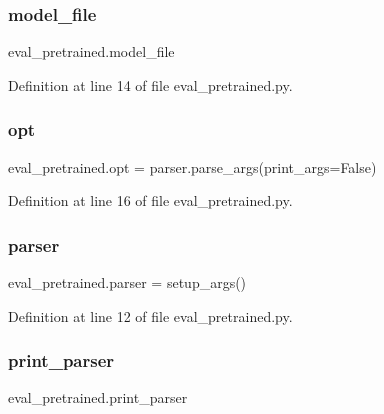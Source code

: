 \subsubsection{\texorpdfstring{model\+\_\+file}{model\_file}}
{\footnotesize\ttfamily eval\+\_\+pretrained.\+model\+\_\+file}



Definition at line 14 of file eval\+\_\+pretrained.\+py.

\mbox{\label{namespaceeval__pretrained_a975c5ce681931ef679dfbc5e05726c15}} 
\subsubsection{\texorpdfstring{opt}{opt}}
{\footnotesize\ttfamily eval\+\_\+pretrained.\+opt = parser.\+parse\+\_\+args(print\+\_\+args=False)}



Definition at line 16 of file eval\+\_\+pretrained.\+py.

\mbox{\label{namespaceeval__pretrained_adf705579068baa81b379b4497dd35de1}} 
\subsubsection{\texorpdfstring{parser}{parser}}
{\footnotesize\ttfamily eval\+\_\+pretrained.\+parser = setup\+\_\+args()}



Definition at line 12 of file eval\+\_\+pretrained.\+py.

\mbox{\label{namespaceeval__pretrained_a07a432570d1cd79d1c432b5af6c211ea}} 
\subsubsection{\texorpdfstring{print\+\_\+parser}{print\_parser}}
{\footnotesize\ttfamily eval\+\_\+pretrained.\+print\+\_\+parser}



